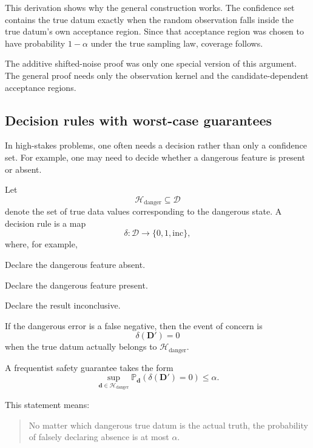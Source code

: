 \documentclass[11pt]{article}
\newcommand{\Dspace}{\mathcal D}
\newcommand{\Dobsrand}{\mathbf D'}
\newcommand{\dobs}{\mathbf d_{\mathrm{obs}}}
\newcommand{\Prob}{\mathbb P}
\begin{document}
This derivation shows why the general construction works. The confidence set contains the true datum exactly when the random observation falls inside the true datum's own acceptance region. Since that acceptance region was chosen to have probability \(1-\alpha\) under the true sampling law, coverage follows.

The additive shifted-noise proof was only one special version of this argument. The general proof needs only the observation kernel and the candidate-dependent acceptance regions.

\subsection{Decision rules with worst-case guarantees}

In high-stakes problems, one often needs a decision rather than only a confidence set. For example, one may need to decide whether a dangerous feature is present or absent.

Let
\[
    \mathcal H_{\mathrm{danger}}\subseteq\Dspace
\]
denote the set of true data values corresponding to the dangerous state. A decision rule is a map
\[
    \delta:\Dspace\to\{0,1,\mathrm{inc}\},
\]
where, for example,
\begin{description}[leftmargin=2.8cm,style=nextline]
    \item[\(\delta(\dobs)=0\).]
    Declare the dangerous feature absent.

    \item[\(\delta(\dobs)=1\).]
    Declare the dangerous feature present.

    \item[\(\delta(\dobs)=\mathrm{inc}\).]
    Declare the result inconclusive.
\end{description}

If the dangerous error is a false negative, then the event of concern is
\[
    \delta(\Dobsrand)=0
\]
when the true datum actually belongs to \(\mathcal H_{\mathrm{danger}}\).

A frequentist safety guarantee takes the form
\[
    \sup_{\mathbf d\in\mathcal H_{\mathrm{danger}}}
    \Prob_{\mathbf d}
    \left(
        \delta(\Dobsrand)=0
    \right)
    \leq
    \alpha.
\]

This statement means:
\begin{quote}
    No matter which dangerous true datum is the actual truth, the probability of falsely declaring absence is at most \(\alpha\).
\end{quote}
\end{document}
